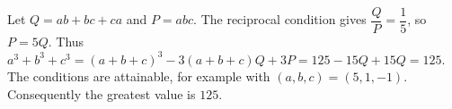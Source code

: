 Let $Q=ab+bc+ca$ and $P=abc$. The reciprocal condition gives $\dfrac{Q}{P}=\dfrac{1}{5}$, so $P=5Q$. Thus $a^3+b^3+c^3=(a+b+c)^3-3(a+b+c)Q+3P=125-15Q+15Q=125$. The conditions are attainable, for example with $(a,b,c)=(5,1,-1)$. Consequently the greatest value is $\boxed{125}$.
